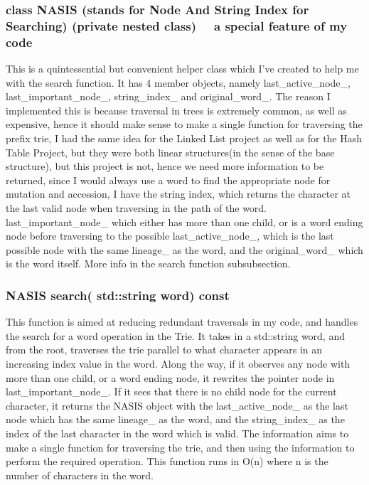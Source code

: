 \documentclass[a4paper]{article}
\begin{document}
\subsubsection{{\color{orange}class} {\color{draculapurple}NASIS} (stands for {\color{draculapurple}N}ode {\color{draculapurple}A}nd {\color{draculapurple}S}tring {\color{draculapurple}I}ndex for {\color{draculapurple}S}earching)  (private nested class)\newline
\faStar~~{\color{Awesome}a special feature of my code}~~\faStar}
This is a quintessential but convenient helper class which I've created to help me with the search function. 
It has 4 member objects, namely {\color{draculapurple}last\_active\_node\_}, {\color{draculapurple}last\_important\_node\_}, {\color{draculapurple}string\_index\_} and {\color{draculapurple}original\_word\_}.	
The reason I implemented this is because traversal in trees is extremely common, as well as expensive, hence it should make sense to make a single function for traversing the prefix trie, 
I had the same idea for the Linked List project as well as for the Hash Table Project, but they were both linear structures(in the sense of the base structure), but this project is not, 
hence we need more information to be returned, since I would always use a word to find the appropriate node for mutation and accession, I have the string index, which returns the 
character at the last valid node when traversing in the path of the word. {\color{draculapurple}last\_important\_node\_} which either has more than one child, 
or is a word ending node before traversing to the possible {\color{draculapurple}last\_active\_node\_}, which is the last possible node with the same 
{\color{draculapurple}lineage\_} as the word, and the {\color{draculapurple}original\_word\_} which is the word itself. 
More info in the search function subsubsection. 

\subsubsection{{\color{orange}NASIS} {\color{draculapurple}search}({\color{orange} std::string} word) {\color{GoldenYellow} const}}
This function is aimed at reducing redundant traversals in my code, and handles the search for a word operation in the Trie. 
It takes in a {\color{orange}std::string} word, and from the root, traverses the trie parallel to what character appears in an increasing index value in the word.
Along the way, if it observes any node with more than one child, or a word ending node, it rewrites the pointer node in {\color{draculapurple}last\_important\_node\_}. 
If it sees that there is no child node for the current character, it returns the {\color{draculapurple}NASIS} object with the {\color{draculapurple}last\_active\_node\_} 
as the last node which has the same {\color{draculapurple}lineage\_} as the word, and the {\color{draculapurple}string\_index\_} as the index of the last character 
in the word which is valid. The information aims to make a single function for traversing the trie, and then using the information to perform the required operation.
This function runs in {\color{lightblue}O(n)} where {\color{lightblue}n} is the number of characters in the word.
\end{document}
